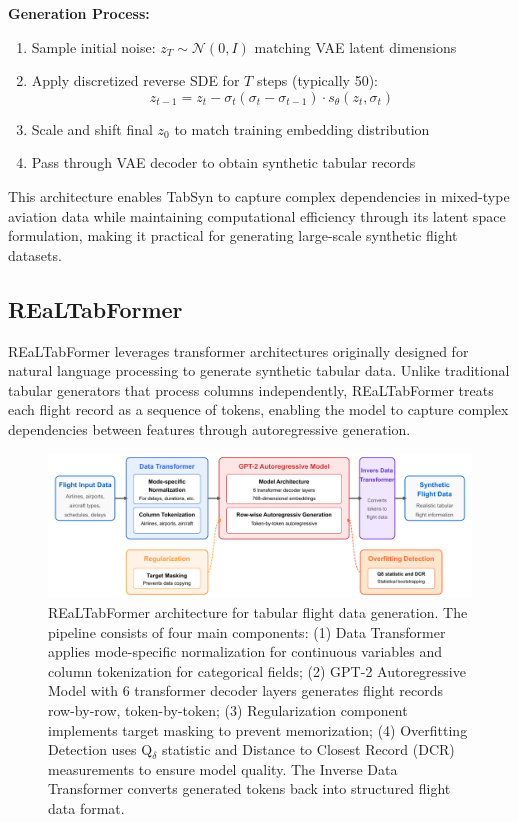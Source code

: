 \documentclass[conference]{IEEEtran}
\begin{document}
\textbf{Generation Process:}
\begin{enumerate}
    \item Sample initial noise: $z_T \sim \mathcal{N}(0, I)$ matching VAE latent dimensions
    \item Apply discretized reverse SDE for $T$ steps (typically 50):
    \begin{equation}
    z_{t-1} = z_t - \sigma_t(\sigma_t - \sigma_{t-1}) \cdot s_\theta(z_t, \sigma_t)
    \end{equation}
    \item Scale and shift final $z_0$ to match training embedding distribution
    \item Pass through VAE decoder to obtain synthetic tabular records
\end{enumerate}

This architecture enables TabSyn to capture complex dependencies in mixed-type aviation data while maintaining computational efficiency through its latent space formulation, making it practical for generating large-scale synthetic flight datasets.

\subsection{REaLTabFormer}


REaLTabFormer \cite{solatorio2023realtabformer} leverages transformer architectures originally designed for natural language processing to generate synthetic tabular data. Unlike traditional tabular generators that process columns independently, REaLTabFormer treats each flight record as a sequence of tokens, enabling the model to capture complex dependencies between features through autoregressive generation.

\begin{figure}[htbp]
    \centering
    \includegraphics[width=\linewidth]{diagrams/rtf.pdf}
    \caption{REaLTabFormer architecture for tabular flight data generation. The pipeline consists of four main components: (1) Data Transformer applies mode-specific normalization for continuous variables and column tokenization for categorical fields; (2) GPT-2 Autoregressive Model with 6 transformer decoder layers generates flight records row-by-row, token-by-token; (3) Regularization component implements target masking to prevent memorization; (4) Overfitting Detection uses Q$_\delta$ statistic and Distance to Closest Record (DCR) measurements to ensure model quality. The Inverse Data Transformer converts generated tokens back into structured flight data format.}
    \label{fig:rtf_architecture}
\end{figure}
\end{document}
